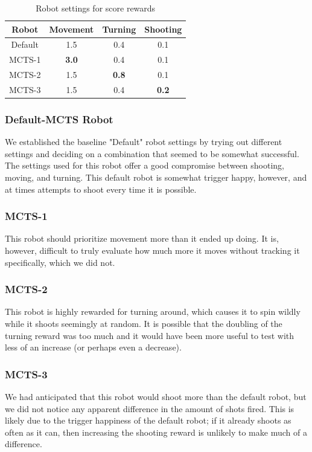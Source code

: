 \begin{table}
\begin{center}
\renewcommand{\arraystretch}{1}
\caption{Robot settings for score rewards}
\label{table-robotsettings}
\begin{tabular}{|c | c | c |c |}
\hline
Robot & Movement & Turning & Shooting\\
\hline
Default & 1.5 & 0.4 & 0.1\\
\hline
MCTS-1 & \textbf{3.0} & 0.4 & 0.1\\
\hline
MCTS-2 & 1.5 & \textbf{0.8} & 0.1\\
\hline
MCTS-3 & 1.5 & 0.4 & \textbf{0.2}\\
\hline
\end{tabular}
\end{center}
\end{table}

\subsubsection{Default-MCTS Robot}
We established the baseline "Default" robot settings by trying out different settings and deciding on a combination that seemed to be somewhat successful. The settings used for this robot offer a good compromise between shooting, moving, and turning. This default robot is somewhat trigger happy, however, and at times attempts to shoot every time it is possible.

\subsubsection{MCTS-1}
This robot should prioritize movement more than it ended up doing. It is, however, difficult to truly evaluate how much more it moves without tracking it specifically, which we did not. 

\subsubsection{MCTS-2} 
This robot is highly rewarded for turning around, which causes it to spin wildly while it shoots seemingly at random. It is possible that the doubling of the turning reward was too much and it would have been more useful to test with less of an increase (or perhaps even a decrease).

\subsubsection{MCTS-3}
We had anticipated that this robot would shoot more than the default robot, but we did not notice any apparent difference in the amount of shots fired. This is likely due to the trigger happiness of the default robot; if it already shoots as often as it can, then increasing the shooting reward is unlikely to make much of a difference.


